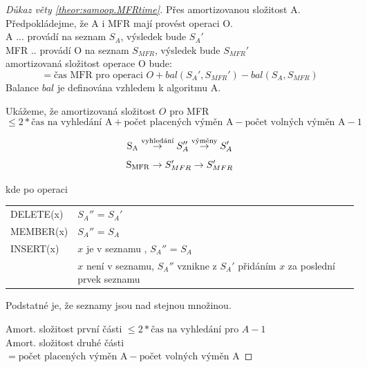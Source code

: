 \begin{proof}[Důkaz věty \ref{theor:samoop.MFRtime}] 
Přes amortizovanou složitost A. \\
Předpokládejme, že A i MFR mají provést operaci O.\\
A ... provádí na seznam $S_A$, výsledek bude $S_A'$ \\
MFR .. provádí O na seznam $S_{MFR}$, výsledek bude $S_{MFR}'$\\
amortizovaná složitost operace O bude: 
$$
= \text{čas MFR pro operaci } O + bal(S_A', S_{MFR}') 
  - bal(S_A, S_{MFR})
$$
Balance $bal$ je definována vzhledem k algoritmu A.
\par

Ukážeme, že amortizovaná složitost $O$ pro MFR 
$$
\leq 2*\text{čas na vyhledání A} +
\text{počet placených výměn A} - \text{počet volných výměn A} - 1
$$

$$
{\rm S_A}\stackrel{\text{vyhledání}}{\rightarrow} S_A''
\stackrel{\text{výměny}}{\rightarrow} S_A'
$$
$$
{\rm S_{MFR}} \rightarrow S_{MFR}' \rightarrow S_{MFR}'
$$
\par

kde po operaci \\

\begin{tabular}{|l|l|}
\hline
DELETE(x) & $S_A''$ = $S_A'$\\
MEMBER(x) & $S_A''$ = $S_A$\\
INSERT(x) & $x$ je v seznamu , $S_A''$ = $S_A$\\
  	  & $x$ není v seznamu, $S_A''$ vznikne z $S_A'$ přidáním $x$ za
		poslední prvek seznamu\\
\hline
\end{tabular}

\hspace{8mm}



Podstatné je, že seznamy jsou nad stejnou množinou.
\par

Amort. složitost první části $\leq 2*\text{čas na vyhledání pro } A - 1$ \\
Amort. složitost druhé části $= \text{počet placených výměn A} - 
\text{počet volných výměn A}$
\par


\end{proof}
